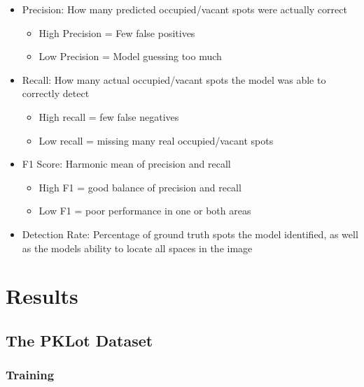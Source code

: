 \documentclass[12pt, letterpaper, oneside]{article}
\begin{document}
\begin{itemize}
    \item Precision: How many predicted occupied/vacant spots were actually correct

    \begin{itemize}
        \item High Precision = Few false positives
        \item Low Precision = Model guessing too much
    \end{itemize}

    \item Recall: How many actual occupied/vacant spots the model was able to correctly detect

    \begin{itemize}
        \item High recall = few false negatives

        \item Low recall = missing many real occupied/vacant spots

    \end{itemize}

    \item F1 Score: Harmonic mean of precision and recall

    \begin{itemize}
        \item High F1 = good balance of precision and recall

        \item Low F1 = poor performance in one or both areas

    \end{itemize}

    \item Detection Rate: Percentage of ground truth spots the model identified, as well as the models ability to locate all spaces in the image
\end{itemize}

\section{Results}
\label{sec:results}

\subsection{The PKLot Dataset}
\subsubsection{Training}
\end{document}
